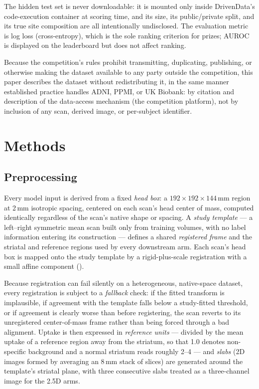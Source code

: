 \documentclass[11pt]{article}
\begin{document}
The hidden test set is never downloadable: it is mounted only inside DrivenData's code-execution container at scoring time, and its size, its public/private split, and its true site composition are all intentionally undisclosed. The evaluation metric is log loss (cross-entropy), which is the sole ranking criterion for prizes; AUROC is displayed on the leaderboard but does not affect ranking.

Because the competition's rules prohibit transmitting, duplicating, publishing, or otherwise making the dataset available to any party outside the competition, this paper describes the dataset without redistributing it, in the same manner established practice handles ADNI, PPMI, or UK Biobank: by citation and description of the data-access mechanism (the competition platform), not by inclusion of any scan, derived image, or per-subject identifier.

\section{Methods}
\label{sec:methods}

\subsection{Preprocessing}
\label{sec:preprocessing}

Every model input is derived from a fixed \emph{head box}: a $192\times192\times144$\,mm region at 2\,mm isotropic spacing, centered on each scan's head center of mass, computed identically regardless of the scan's native shape or spacing. A \emph{study template} --- a left--right symmetric mean scan built only from training volumes, with no label information entering its construction --- defines a shared \emph{registered frame} and the striatal and reference regions used by every downstream arm. Each scan's head box is mapped onto the study template by a rigid-plus-scale registration with a small affine component ().

Because registration can fail silently on a heterogeneous, native-space dataset, every registration is subject to a \emph{fallback} check: if the fitted transform is implausible, if agreement with the template falls below a study-fitted threshold, or if agreement is clearly worse than before registering, the scan reverts to its unregistered center-of-mass frame rather than being forced through a bad alignment. Uptake is then expressed in \emph{reference units} --- divided by the mean uptake of a reference region away from the striatum, so that 1.0 denotes non-specific background and a normal striatum reads roughly 2--4 --- and \emph{slabs} (2D images formed by averaging an 8\,mm stack of slices) are generated around the template's striatal plane, with three consecutive slabs treated as a three-channel image for the 2.5D arms.
\end{document}
